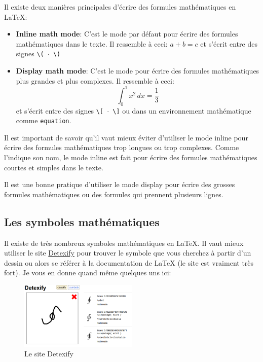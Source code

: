 Il existe deux manières principales d'écrire des formules mathématiques en LaTeX:\@

\begin{itemize}
    \item \textbf{Inline math mode}: C'est le mode par défaut pour écrire des formules mathématiques dans le texte.
    Il ressemble à ceci: \(a + b = c\) et s'écrit entre des signes \texttt{\textbackslash( \(\cdot\) \textbackslash)}

    \item \textbf{Display math mode}: C'est le mode pour écrire des formules mathématiques plus grandes et plus complexes.
    Il ressemble à ceci:
    \begin{equation}
        \int_0^1 x^2 \, dx = \frac{1}{3}
    \end{equation}
    et s'écrit entre des signes \texttt{\textbackslash[ \(\cdot\) \textbackslash]} ou 
    dans un environnement mathématique comme \texttt{equation}.
\end{itemize}

Il est important de savoir qu'il vaut mieux éviter d'utiliser le mode inline
pour écrire des formules mathématiques trop longues ou trop complexes. Comme l'indique son nom,
le mode inline est fait pour écrire des formules mathématiques courtes et simples dans le texte.

Il est une bonne pratique d'utiliser le mode display pour écrire des grosses formules
mathématiques ou des formules qui prennent plusieurs lignes.

\subsection{Les symboles mathématiques}\label{subsec:latex_math_symbols}
Il existe de très nombreux symboles mathématiques en LaTeX.
Il vaut mieux utiliser le site \href{detexify.kirelabs.org}{Detexify} pour
trouver le symbole que vous cherchez à partir d'un dessin ou alors se référer à la
documentation de LaTeX (le site est vraiment très fort). Je vous en donne quand même quelques uns ici:

\begin{figure}[H]
    \centering
    \includegraphics[width=0.5\textwidth]{./4_Mathematics/detexify}
    \caption{Le site Detexify}\label{fig:detexify}
\end{figure}

